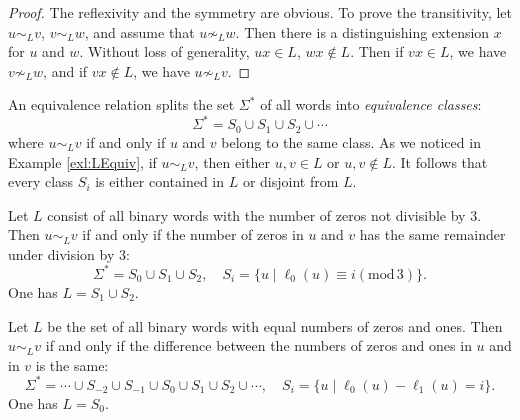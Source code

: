\begin{page}
\setcounter{section}{4}
\setcounter{subsection}{1}
\setcounter{dfn}{3}
\label{portion:1051}

\begin{proof}
The reflexivity and the symmetry are obvious.
To prove the transitivity, let $u \sim_L v$, $v \sim_L w$, and assume that $u \not\sim_L w$.
Then there is a distinguishing extension $x$ for $u$ and $w$.
Without loss of generality, $ux \in L$, $wx \notin L$.
Then if $vx \in L$, we have $v \not\sim_L w$, and if $vx \notin L$, we have $u \not\sim_L v$.
\end{proof}

An equivalence relation splits the set $\Sigma^*$ of all words into \emph{equivalence classes}:
\begin{equation}
\label{eqn:SigmaEqClasses}
\Sigma^* = S_0 \cup S_1 \cup S_2 \cup \cdots
\end{equation}
where $u \sim_L v$ if and only if $u$ and $v$ belong to the same class.
As we noticed in Example \ref{exl:LEquiv}, if $u \sim_L v$, then either $u,v \in L$ or $u,v \notin L$.
It follows that every class $S_i$ is either contained in $L$ or disjoint from $L$.


\end{page}

\begin{page}
\setcounter{section}{4}
\setcounter{subsection}{1}
\setcounter{dfn}{4}
\label{portion:1053}

\begin{exl}
Let $L$ consist of all binary words with the number of zeros not divisible by $3$.
Then $u \sim_L v$ if and only if the number of zeros in $u$ and $v$ has the same remainder under division by $3$:
\[
\Sigma^* = S_0 \cup S_1 \cup S_2, \quad S_i = \{u \mid \ell_0(u) \equiv i (\mathrm{mod}\, 3)\}.
\]
One has $L = S_1 \cup S_2$.
\end{exl}

\end{page}

\begin{page}
\setcounter{section}{4}
\setcounter{subsection}{1}
\setcounter{dfn}{5}
\label{portion:1056}

\begin{exl}
Let $L$ be the set of all binary words with equal numbers of zeros and ones.
Then $u \sim_L v$ if and only if the difference between the numbers of zeros and ones in $u$ and in $v$ is the same:
\[
\Sigma^* = \cdots \cup S_{-2} \cup S_{-1} \cup S_0 \cup S_1 \cup S_2 \cup \cdots, \quad S_i = \{u \mid \ell_0(u) - \ell_1(u) = i\}.
\]
One has $L = S_0$.
\end{exl}

\end{page}

